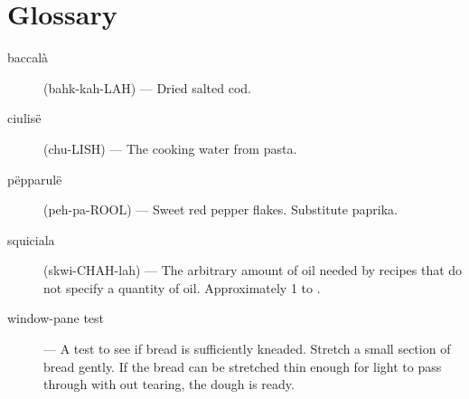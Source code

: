 \documentclass{book}
\begin{document}
\def\ThisFile{rcp:ToastingNuts}



\chapter{Glossary}
\begin{description}
\item[baccal\`a] (bahk-kah-LAH) --- Dried salted cod.
\item[ciulis\"e] (chu-LISH) --- The cooking water from pasta.
\item[p\"epparul\"e] (peh-pa-ROOL) --- Sweet red pepper flakes. Substitute paprika.
\item[squiciala] (skwi-CHAH-lah) --- The arbitrary amount of oil needed by recipes that do not specify a quantity of oil. Approximately 1 to .
\item[window-pane test] --- A test to see if bread is sufficiently kneaded. Stretch a small section of bread gently. If the bread can be stretched thin enough for light to pass through with out tearing, the dough is ready.
\end{description}

\printindex
\end{document}
